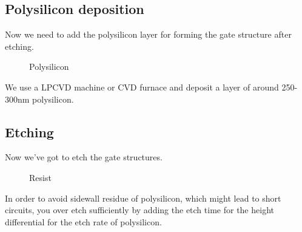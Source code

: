 \subsection{Polysilicon deposition}\label{step_depositing_poly}

Now we need to add the polysilicon layer for forming the gate structure after etching.

\begin{figure}[H]
	\centering
	\begin{tikzpicture}[node distance = 3cm, auto, thick,scale=\CrossSectionOnly, every node/.style={transform shape}]
		
	\end{tikzpicture}
	\drawStepArrow{}
	\begin{tikzpicture}[node distance = 3cm, auto, thick,scale=\CrossSectionOnly, every node/.style={transform shape}]
		
	\end{tikzpicture}
	\caption{Polysilicon}
\end{figure}

We use a LPCVD machine or CVD furnace and deposit a layer of around 250-300nm polysilicon.

\newpage

\subsection{Etching}

Now we've got to etch the gate structures.

\begin{figure}[H]
	\centering
	\begin{tikzpicture}[node distance = 3cm, auto, thick,scale=\CrossAndTopSection, every node/.style={transform shape}]
		
	\end{tikzpicture}
	\drawStepArrow{}
	\begin{tikzpicture}[node distance = 3cm, auto, thick,scale=\CrossAndTopSection, every node/.style={transform shape}]
		
	\end{tikzpicture}
	\caption{Resist}
\end{figure}

In order to avoid sidewall residue of polysilicon, which might lead to short circuits, you over etch sufficiently by adding the etch time for the height differential for the etch rate of polysilicon.
